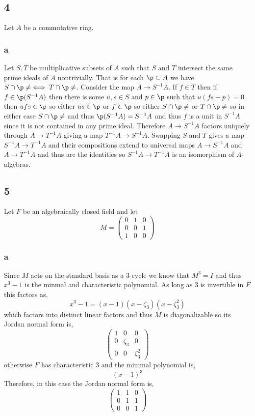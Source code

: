 \documentclass[12pt]{article}
\begin{document}
\subsection{4}

Let $A$ be a commutative ring.

\subsubsection{a}

Let $S, T$ be multiplicative subsets of $A$ such that $S$ and $T$ intersect the same prime ideals of $A$ nontrivially. That is for each $\p \subset A$ we have $S \cap \p \neq \empty \iff T \cap \p \neq \empty$. Consider the map $A \to S^{-1} A$. If $f \in T$ then if $f \in \p (S^{-1} A)$ then there is some $u, s \in S$ and $p \in \p$ such that $u(fs - p) = 0$ then $ufs \in \p$ so either $us \in \p$ or $f \in \p$ so either $S \cap \p \neq \empty$ or $T \cap \p \neq \empty$ so in either case $S \cap \p \neq \empty$ and thus $\p (S^{-1} A) = S^{-1} A$ and thus $f$ is a unit in $S^{-1} A$ since it is not contained in any prime ideal. Therefore $A \to S^{-1} A$ factors uniquely through $A \to T^{-1} A$ giving a map $T^{-1} A \to S^{-1} A$. Swapping $S$ and $T$ gives a map $S^{-1} A \to T^{-1} A$ and their compositions extend to universal maps $A \to S^{-1} A$ and $A \to T^{-1} A$ and thus are the identities so $S^{-1} A \to T^{-1} A$ is an isomorphism of $A$-algebras.

\subsection{5}

Let $F$ be an algebraically closed field and let 
\[ M = \begin{pmatrix}
0 & 1 & 0 
\\
0 & 0 & 1 
\\
1 & 0 & 0
\end{pmatrix} \]

\subsubsection{a}

Since $M$ acts on the standard basis as a $3$-cycle we know that $M^3 = I$ and thus $x^3 - 1$ is the minmal and characteristic polynomial. As long as $3$ is invertible in $F$ this factors as,
\[ x^3 - 1 = (x - 1)(x - \zeta_3)(x - \zeta_3^2) \]
which factors into distinct linear factors and thus $M$ is diagonalizable so its Jordan normal form is,
\[ \begin{pmatrix}
1 & 0 & 0
\\
0 & \zeta_3 & 0
\\
0 & 0 & \zeta_3^2 
\end{pmatrix} \]
otherwise $F$ has characteristic $3$ and the minimal polynomial is,
\[ (x - 1)^3 \]
Therefore, in this case the Jordan normal form is,
\[ \begin{pmatrix}
1 & 1 & 0
\\
0 & 1 & 1
\\
0 & 0 & 1
\end{pmatrix} \]
\end{document}
